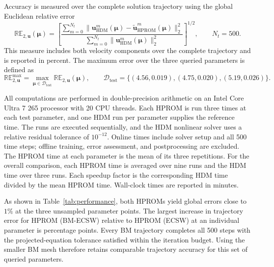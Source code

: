 \documentclass[a4paper,12pt]{article}
\newcommand{\vect}[1]{\boldsymbol{#1}}
\begin{document}
Accuracy is measured over the complete solution trajectory using the global Euclidean relative error~\cite{ares2026closure}
\begin{equation}
 \mathbb{RE}_{2,\vect{u}}(\vect{\mu})
 =\left[\frac{\sum_{m=0}^{N_t}
              \|\vect{u}_{\mathrm{HDM}}^m(\vect{\mu})
                -\widetilde{\vect{u}}_{\mathrm{HPROM}}^m(\vect{\mu})\|_2^2}
             {\sum_{m=0}^{N_t}\|\vect{u}_{\mathrm{HDM}}^m(\vect{\mu})\|_2^2}
        \right]^{1/2},\qquad N_t=500.
 \label{eq:error}
\end{equation}
This measure includes both velocity components over the complete trajectory and is reported in percent. The maximum error over the three queried parameters is defined as
\begin{equation}
 \mathbb{RE}_{2,\vect{u}}^{\max}
 =\max_{\vect{\mu}\in\mathcal D_{\mathrm{test}}}
             \mathbb{RE}_{2,\vect{u}}(\vect{\mu}),
 \qquad
 \mathcal D_{\mathrm{test}}=\{(4.56,0.019),(4.75,0.020),(5.19,0.026)\}.
 \label{eq:max-error}
\end{equation}

All computations are performed in double-precision arithmetic on an Intel Core Ultra 7 265 processor with 20 CPU threads. Each HPROM is run three times at each test parameter, and one HDM run per parameter supplies the reference time. The runs are executed sequentially, and the HDM nonlinear solver uses a relative residual tolerance of $10^{-12}$. Online times include solver setup and all 500 time steps; offline training, error assessment, and postprocessing are excluded. The HPROM time at each parameter is the mean of its three repetitions. For the overall comparison, each HPROM time is averaged over nine runs and the HDM time over three runs. Each speedup factor is the corresponding HDM time divided by the mean HPROM time. Wall-clock times are reported in minutes.

\begin{table}[H]
 \centering\footnotesize
 \setlength{\tabcolsep}{3pt}
 \caption{Online trajectory errors, wall-clock times, and speedup factors relative to the HDM at the three unsampled parameter points.}
 \label{tab:performance}
 
\end{table}

As shown in Table~\ref{tab:performance}, both HPROMs yield global errors close to $1\%$ at the three unsampled parameter points. The largest increase in trajectory error for HPROM (BM-ECSW) relative to HPROM (ECSW) at an individual parameter is \BMLargestErrorIncrease{} percentage points. Every BM trajectory completes all 500 steps with the projected-equation tolerance satisfied within the iteration budget. Using the smaller BM mesh therefore retains comparable trajectory accuracy for this set of queried parameters.
\end{document}
